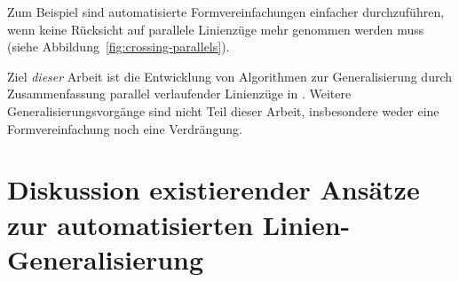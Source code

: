 \documentclass[../main/thesis.tex]{subfiles}
\begin{document}
Zum Beispiel sind automatisierte Formvereinfachungen einfacher durchzuführen, wenn keine Rücksicht auf parallele Linienzüge mehr genommen werden muss (siehe Abbildung~\ref{fig:crossing-parallels}).

Ziel \emph{dieser} Arbeit ist die Entwicklung von Algorithmen zur Generalisierung durch Zusammenfassung parallel verlaufender Linienzüge in \osm{}.
Weitere Generalisierungsvorgänge sind nicht Teil dieser Arbeit, insbesondere weder eine Formvereinfachung noch eine Verdrängung.

%	
%	
%	



\section[Diskussion existierender Ansätze]{Diskussion existierender Ansätze zur automatisierten Linien-Generalisierung}
\label{ch:existing-approaches}
\end{document}
